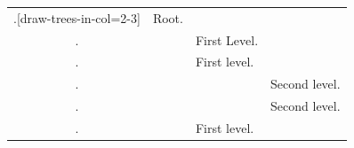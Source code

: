 \documentclass{article}
\begin{document}
\renewcommand{\arraystretch}{1.3}

\begin{NiceTabular}{>{.}c w{l}{3mm} w{l}{3mm} w{l}{3mm}}[draw-trees-in-col=2-3]
    & Root.           \\
    && First Level.   \\
    && First level.   \\
    &&& Second level. \\
    &&& Second level.  \\
    && First level.    \\
\end{NiceTabular}
\end{document}
